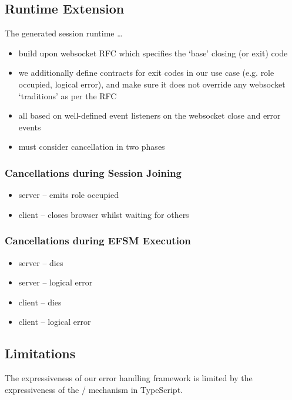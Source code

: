 \subsection{Runtime Extension}
\label{subsection:errorruntime}

The generated session runtime \dots

\begin{itemize}
\item build upon websocket RFC which specifies the `base' closing (or exit) code
\item we additionally define contracts for exit codes in our use case (e.g. role occupied, logical error), and make sure it does not override any websocket `traditions' as per the RFC
\item all based on well-defined event listeners on the websocket close and error events
\item must consider cancellation in two phases
\end{itemize}

\subsubsection{Cancellations during Session Joining}

\begin{itemize}
\item server -- emits role occupied
\item client -- closes browser whilst waiting for others
\end{itemize}

\subsubsection{Cancellations during EFSM Execution}

\begin{itemize}
\item server -- dies
\item server -- logical error
\item client -- dies
\item client -- logical error
\end{itemize}

\subsection{Limitations}
\label{subsection:errorlimit}

The expressiveness of our error handling framework is
limited by the expressiveness of the 
 /  mechanism
in TypeScript.


